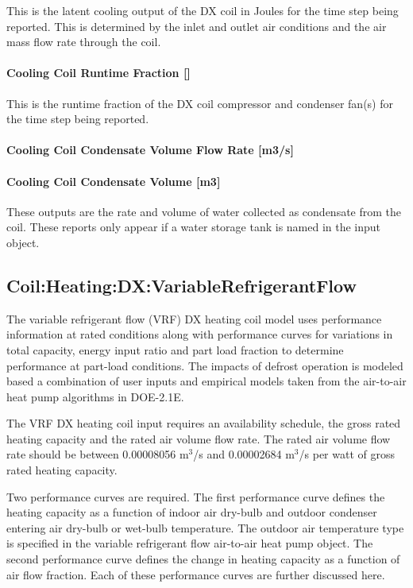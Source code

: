This is the latent cooling output of the DX coil in Joules for the time step being reported. This is determined by the inlet and outlet air conditions and the air mass flow rate through the coil.

\paragraph{Cooling Coil Runtime Fraction {[]}}\label{cooling-coil-runtime-fraction}

This is the runtime fraction of the DX coil compressor and condenser fan(s) for the time step being reported.

\paragraph{Cooling Coil Condensate Volume Flow Rate {[}m3/s{]}}\label{cooling-coil-condensate-volume-flow-rate-m3s-1}

\paragraph{Cooling Coil Condensate Volume {[}m3{]}}\label{cooling-coil-condensate-volume-m3-1}

These outputs are the rate and volume of water collected as condensate from the coil. These reports only appear if a water storage tank is named in the input object.

\subsection{Coil:Heating:DX:VariableRefrigerantFlow}\label{coilheatingdxvariablerefrigerantflow}

The variable refrigerant flow (VRF) DX heating coil model uses performance information at rated conditions along with performance curves for variations in total capacity, energy input ratio and part load fraction to determine performance at part-load conditions. The impacts of defrost operation is modeled based a combination of user inputs and empirical models taken from the air-to-air heat pump algorithms in DOE-2.1E.

The VRF DX heating coil input requires an availability schedule, the gross rated heating capacity and the rated air volume flow rate. The rated air volume flow rate should be between 0.00008056 m\(^{3}\)/s and 0.00002684 m\(^{3}\)/s per watt of gross rated heating capacity. 

Two performance curves are required. The first performance curve defines the heating capacity as a function of indoor air dry-bulb and outdoor condenser entering air dry-bulb or wet-bulb temperature. The outdoor air temperature type is specified in the variable refrigerant flow air-to-air heat pump object. The second performance curve defines the change in heating capacity as a function of air flow fraction. Each of these performance curves are further discussed here.

